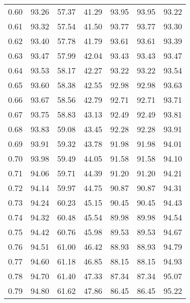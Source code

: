 \begin{tabular}{|c|c|c|c|c|c|c|}
      0.60 &     93.26 &     57.37 &      41.29 &   93.95 &      93.95 &         93.22 \\
      0.61 &     93.32 &     57.54 &      41.50 &   93.77 &      93.77 &         93.30 \\
      0.62 &     93.40 &     57.78 &      41.79 &   93.61 &      93.61 &         93.39 \\
      0.63 &     93.47 &     57.99 &      42.04 &   93.43 &      93.43 &         93.47 \\
      0.64 &     93.53 &     58.17 &      42.27 &   93.22 &      93.22 &         93.54 \\
      0.65 &     93.60 &     58.38 &      42.55 &   92.98 &      92.98 &         93.63 \\
      0.66 &     93.67 &     58.56 &      42.79 &   92.71 &      92.71 &         93.71 \\
      0.67 &     93.75 &     58.83 &      43.13 &   92.49 &      92.49 &         93.81 \\
      0.68 &     93.83 &     59.08 &      43.45 &   92.28 &      92.28 &         93.91 \\
      0.69 &     93.91 &     59.32 &      43.78 &   91.98 &      91.98 &         94.01 \\
      0.70 &     93.98 &     59.49 &      44.05 &   91.58 &      91.58 &         94.10 \\
      0.71 &     94.06 &     59.71 &      44.39 &   91.20 &      91.20 &         94.21 \\
      0.72 &     94.14 &     59.97 &      44.75 &   90.87 &      90.87 &         94.31 \\
      0.73 &     94.24 &     60.23 &      45.15 &   90.45 &      90.45 &         94.43 \\
      0.74 &     94.32 &     60.48 &      45.54 &   89.98 &      89.98 &         94.54 \\
      0.75 &     94.42 &     60.76 &      45.98 &   89.53 &      89.53 &         94.67 \\
      0.76 &     94.51 &     61.00 &      46.42 &   88.93 &      88.93 &         94.79 \\
      0.77 &     94.60 &     61.18 &      46.85 &   88.15 &      88.15 &         94.93 \\
      0.78 &     94.70 &     61.40 &      47.33 &   87.34 &      87.34 &         95.07 \\
      0.79 &     94.80 &     61.62 &      47.86 &   86.45 &      86.45 &         95.22 \\

\end{tabular}
